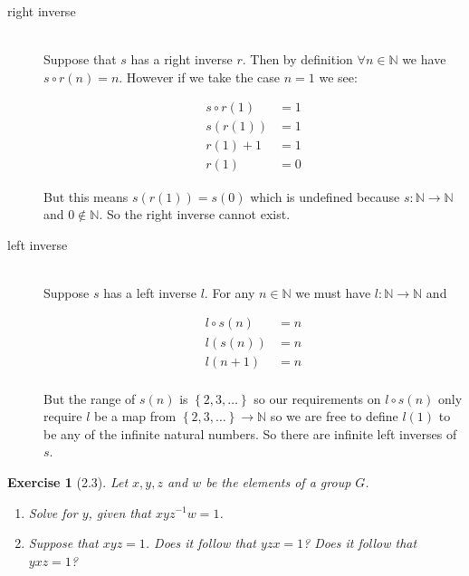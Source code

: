 \documentclass[12pt,leqno]{article}
\numberwithin{equation}{section}
\newtheorem*{exer}{Exercise}
\theoremstyle{definition}
\begin{document}
\begin{description}
    \item[right inverse] \hfill \\

    Suppose that $s$ has a right inverse $r$. Then by definition $\forall n \in
    \mathbb N$ we have $s \circ r(n) = n$. However if we take the case $n = 1$ we see:

    \begin{align*}
        s \circ r(1) &= 1 \\
        s(r(1)) &= 1    \\
        r(1) + 1 &= 1   \\
        r(1) &= 0
    \end{align*}

    But this means $s(r(1)) = s(0)$ which is undefined because $s: \mathbb N
    \rightarrow \mathbb N$ and $0 \notin \mathbb N$. So the right inverse
    cannot exist.

    \item[left inverse] \hfill \\

    Suppose $s$ has a left inverse $l$. For any $n \in \mathbb N$ we must have
    $l: \mathbb N \rightarrow \mathbb N$ and

    \begin{align*}
        l \circ s(n) &= n   \\
        l(s(n)) &= n    \\
        l(n + 1) &= n   \\
    \end{align*}

    But the range of $s(n)$ is $\left\{ 2, 3, \dots \right\} $ so our
    requirements on $l \circ s(n)$ only require $l$ be a map from $ \left\{ 2,
    3, \dots \right\} \rightarrow \mathbb N$ so we are free to define $l(1)$ to
    be any of the infinite natural numbers. So there are infinite left inverses
    of $s$.

\end{description}

\begin{exer}[2.3]
Let $x,y,z$  and $w$ be the elements of a group $G$. 
\begin{enumerate}
\item[(a)] Solve for $y$, given that $xyz^{-1}w=1$.
\item[(b)] Suppose that $xyz=1$. Does it follow that $yzx=1$? Does it follow that $yxz=1$?
\end{enumerate}
\end{exer}
\end{document}
